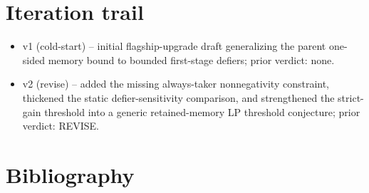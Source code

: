 \documentclass[11pt]{article}
\theoremstyle{definition}
\theoremstyle{plain}
\theoremstyle{remark}
\begin{document}
\section{Iteration trail}
\begin{itemize}[leftmargin=*]
\item v1 (cold-start) -- initial flagship-upgrade draft generalizing the parent one-sided memory bound to bounded first-stage defiers; prior verdict: none.
\item v2 (revise) -- added the missing always-taker nonnegativity constraint, thickened the static defier-sensitivity comparison, and strengthened the strict-gain threshold into a generic retained-memory LP threshold conjecture; prior verdict: REVISE.
\end{itemize}

\section*{Bibliography}
\end{document}

